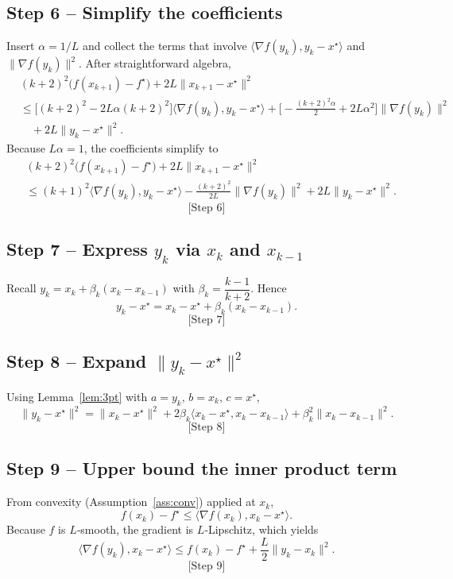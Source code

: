 \documentclass{article}
\begin{document}
\subsection*{Step 6 – Simplify the coefficients}
Insert $\alpha=1/L$ and collect the terms that involve $\langle\nabla f(y_{k}),y_{k}-x^{\star}\rangle$ and $\|\nabla f(y_{k})\|^{2}$.
After straightforward algebra,
\[
\begin{aligned}
&(k+2)^{2}\bigl(f(x_{k+1})-f^{\star}\bigr)
   +2L\|x_{k+1}-x^{\star}\|^{2}\\[4pt]
&\le \bigl[(k+2)^{2}-2L\alpha(k+2)^{2}\bigr]\langle\nabla f(y_{k}),y_{k}-x^{\star}\rangle
   +\bigl[-\tfrac{(k+2)^{2}\alpha}{2}+2L\alpha^{2}\bigr]\|\nabla f(y_{k})\|^{2}\\[4pt]
&\quad+2L\|y_{k}-x^{\star}\|^{2}.
\end{aligned}
\tag{6}
\]
Because $L\alpha=1$, the coefficients simplify to
\[
\begin{aligned}
&(k+2)^{2}\bigl(f(x_{k+1})-f^{\star}\bigr)
   +2L\|x_{k+1}-x^{\star}\|^{2}\\[4pt]
&\le (k+1)^{2}\langle\nabla f(y_{k}),y_{k}-x^{\star}\rangle
   -\frac{(k+2)^{2}}{2L}\|\nabla f(y_{k})\|^{2}
   +2L\|y_{k}-x^{\star}\|^{2}.
\end{aligned}
\tag{7}
\]
\[
\text{[Step 6]}
\]

\subsection*{Step 7 – Express $y_{k}$ via $x_{k}$ and $x_{k-1}$}
Recall $y_{k}=x_{k}+ \beta_{k}(x_{k}-x_{k-1})$ with $\beta_{k}=\dfrac{k-1}{k+2}$.
Hence
\[
y_{k}-x^{\star}=x_{k}-x^{\star}+\beta_{k}(x_{k}-x_{k-1}).
\tag{8}
\]
\[
\text{[Step 7]}
\]

\subsection*{Step 8 – Expand $\|y_{k}-x^{\star}\|^{2}$}
Using Lemma~\ref{lem:3pt} with $a=y_{k},\,b=x_{k},\,c=x^{\star}$,
\[
\|y_{k}-x^{\star}\|^{2}
 =\|x_{k}-x^{\star}\|^{2}
   +2\beta_{k}\langle x_{k}-x^{\star},x_{k}-x_{k-1}\rangle
   +\beta_{k}^{2}\|x_{k}-x_{k-1}\|^{2}.
\tag{9}
\]
\[
\text{[Step 8]}
\]

\subsection*{Step 9 – Upper bound the inner product term}
From convexity (Assumption~\ref{ass:conv}) applied at $x_{k}$,
\[
f(x_{k})-f^{\star}\le\langle\nabla f(x_{k}),x_{k}-x^{\star}\rangle .
\]
Because $f$ is $L$‑smooth, the gradient is $L$‑Lipschitz, which yields
\[
\langle\nabla f(y_{k}),x_{k}-x^{\star}\rangle
\le f(x_{k})-f^{\star}+ \frac{L}{2}\|y_{k}-x_{k}\|^{2}.
\tag{10}
\]
\[
\text{[Step 9]}
\]
\end{document}
